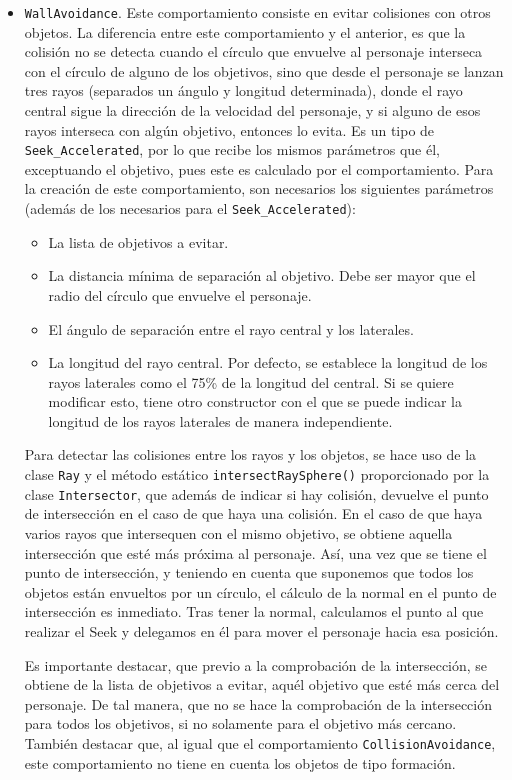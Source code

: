 \begin{itemize}
 \item \texttt{WallAvoidance}. Este comportamiento consiste en evitar colisiones con otros objetos. La diferencia entre este comportamiento y el anterior, es que la colisión no se detecta cuando el círculo que envuelve al personaje interseca con el círculo de alguno de los objetivos, sino que desde el personaje se lanzan tres rayos (separados un ángulo y longitud determinada), donde el rayo central sigue la dirección de la velocidad del personaje, y si alguno de esos rayos interseca con algún objetivo, entonces lo evita. Es un tipo de \texttt{Seek\_Accelerated}, por lo que recibe los mismos parámetros que él, exceptuando el objetivo, pues este es calculado por el comportamiento. Para la creación de este comportamiento, son necesarios los siguientes parámetros (además de los necesarios para el \texttt{Seek\_Accelerated}):
 \begin{itemize}
  \item La lista de objetivos a evitar.
  \item La distancia mínima de separación al objetivo. Debe ser mayor que el radio del círculo que envuelve el personaje.
  \item El ángulo de separación entre el rayo central y los laterales.
  \item La longitud del rayo central. Por defecto, se establece la longitud de los rayos laterales como el 75\% de la longitud del central. Si se quiere modificar esto, tiene otro constructor con el que se puede indicar la longitud de los rayos laterales de manera independiente.
 \end{itemize}
 Para detectar las colisiones entre los rayos y los objetos, se hace uso de la clase \texttt{Ray} y el método estático \texttt{intersectRaySphere()} proporcionado por la clase \texttt{Intersector}, que además de indicar si hay colisión, devuelve el punto de intersección en el caso de que haya una colisión. En el caso de que haya varios rayos que intersequen con el mismo objetivo, se obtiene aquella intersección que esté más próxima al personaje. Así, una vez que se tiene el punto de intersección, y teniendo en cuenta que suponemos que todos los objetos están envueltos por un círculo, el cálculo de la normal en el punto de intersección es inmediato. Tras tener la normal, calculamos el punto al que realizar el Seek y delegamos en él para mover el personaje hacia esa posición.
 
 Es importante destacar, que previo a la comprobación de la intersección, se obtiene de la lista de objetivos a evitar, aquél objetivo que esté más cerca del personaje. De tal manera, que no se hace la comprobación de la intersección para todos los objetivos, si no solamente para el objetivo más cercano. También destacar que, al igual que el comportamiento \texttt{CollisionAvoidance}, este comportamiento no tiene en cuenta los objetos de tipo formación. 
 

\end{itemize}
